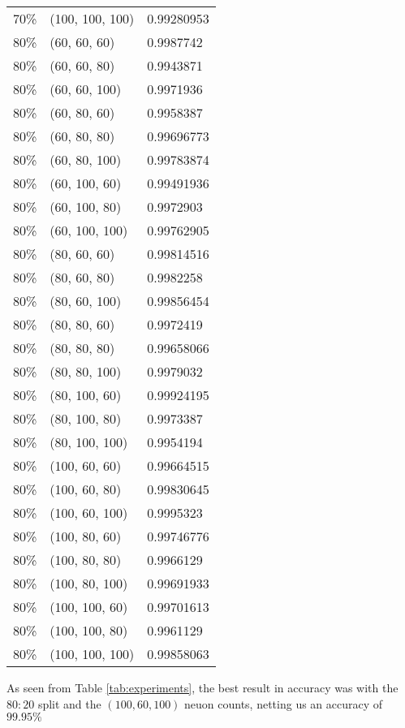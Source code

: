 \documentclass[conference]{IEEEtran}
\begin{document}
\begin{table}
\begin{tabularx}{\columnwidth}{lXl}
    70\% & (100, 100, 100) & 0.99280953\\
    80\% & (60, 60, 60) & 0.9987742\\
    80\% & (60, 60, 80) & 0.9943871\\
    80\% & (60, 60, 100) & 0.9971936\\
    80\% & (60, 80, 60) & 0.9958387\\
    80\% & (60, 80, 80) & 0.99696773\\
    80\% & (60, 80, 100) & 0.99783874\\
    80\% & (60, 100, 60) & 0.99491936\\
    80\% & (60, 100, 80) & 0.9972903\\
    80\% & (60, 100, 100) & 0.99762905\\
    80\% & (80, 60, 60) & 0.99814516\\
    80\% & (80, 60, 80) & 0.9982258\\
    80\% & (80, 60, 100) & 0.99856454\\
    80\% & (80, 80, 60) & 0.9972419\\
    80\% & (80, 80, 80) & 0.99658066\\
    80\% & (80, 80, 100) & 0.9979032\\
    80\% & (80, 100, 60) & 0.99924195\\
    80\% & (80, 100, 80) & 0.9973387\\
    80\% & (80, 100, 100) & 0.9954194\\
    80\% & (100, 60, 60) & 0.99664515\\
    80\% & (100, 60, 80) & 0.99830645\\
    80\% & (100, 60, 100) & 0.9995323\\
    80\% & (100, 80, 60) & 0.99746776\\
    80\% & (100, 80, 80) & 0.9966129\\
    80\% & (100, 80, 100) & 0.99691933\\
    80\% & (100, 100, 60) & 0.99701613\\
    80\% & (100, 100, 80) & 0.9961129\\
    80\% & (100, 100, 100) & 0.99858063\\
    \bottomrule
\end{tabularx}
\end{table}
As seen from Table \ref{tab:experiments}, the best result in accuracy was with the $80:20$ split and the $(100, 60, 100)$ neuon counts, netting us an accuracy of $99.95\%$
\end{document}
